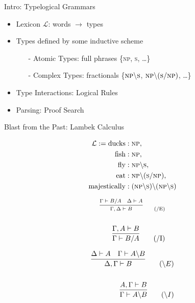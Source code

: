 \documentclass{beamer}
\begin{document}
\begin{frame}{Intro: Typelogical Grammars}
\begin{itemize}
\item Lexicon $\mathcal{L}$: words $\to$ \alert{types}
\item Types defined by some inductive scheme
\begin{itemize}
\item[-] Atomic Types: full phrases \{\textsc{np}, \textsc{s}, \dots\}
\item[-] Complex Types: fractionals \{$\textsc{np}\backslash \textsc{s}$, $\textsc{np}\backslash (\textsc{s}/\textsc{np})$, \dots\}
\end{itemize}
\item Type Interactions: \alert{Logical Rules}
\item Parsing: \alert{Proof Search}
\end{itemize}
\end{frame}

\begin{frame}{Blast from the Past: Lambek Calculus}
\begin{minipage}{0.35\textwidth}
\small
\begin{align*}
\mathcal{L} := 	\text{ducks} &: \textsc{np},  \\
				\text{fish} &: \textsc{np},  \\
				\text{fly} &: \textsc{np}\backslash \textsc{s}, \\
				\text{eat} &: \textsc{np}\backslash (\textsc{s} / \textsc{np}), \\
				\text{majestically} &: (\textsc{np}\backslash \textsc{s}) \backslash (\textsc{np} \backslash \textsc{s})
\end{align*}
\end{minipage}\begin{minipage}{0.45\textwidth}
\scriptsize
\begin{minipage}{0.6\textwidth}
    \begin{align*}
    	\scriptsize
        \infer{\Gamma, \Delta \vdash B}{
            \Gamma \vdash B / A
            &
            \Delta \vdash A
        }\tag{/E}\\
        \\
        \infer{\Gamma \vdash B/A}{
            \Gamma, A \vdash B
        }\tag{/I}
    \end{align*}
 \end{minipage}\begin{minipage}{0.6\textwidth}
	    \begin{align*}
	        \infer{\Delta, \Gamma \vdash B}{
	            \Delta \vdash A
	            &
	            \Gamma \vdash A\backslash B
	        }\tag{$\backslash E$}\\
	        \\
	        \infer{\Gamma \vdash A\backslash B}{
	            A, \Gamma \vdash B
	        }\tag{$\backslash I$}
	    \end{align*}		
\end{minipage}
\end{minipage}
\end{frame}
\end{document}
